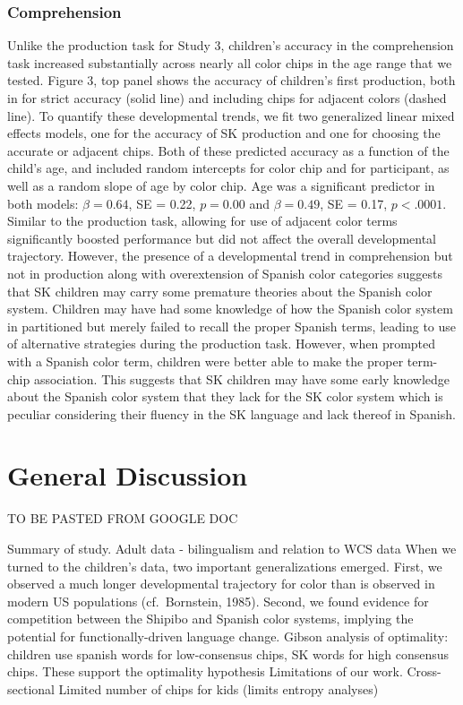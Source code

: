 \documentclass[
  english,
  ,man,floatsintext]{apa6}
\begin{document}
\hypertarget{comprehension}{%
\subsubsection{Comprehension}\label{comprehension}}

Unlike the production task for Study 3, children's accuracy in the comprehension task increased substantially across nearly all color chips in the age range that we tested. Figure 3, top panel shows the accuracy of children's first production, both in for strict accuracy (solid line) and including chips for adjacent colors (dashed line). To quantify these developmental trends, we fit two generalized linear mixed effects models, one for the accuracy of SK production and one for choosing the accurate or adjacent chips. Both of these predicted accuracy as a function of the child's age, and included random intercepts for color chip and for participant, as well as a random slope of age by color chip. Age was a significant predictor in both models: \(\beta = 0.64\), SE = 0.22, \(p = 0.00\) and \(\beta = 0.49\), SE = 0.17, \(p < .0001\).
Similar to the production task, allowing for use of adjacent color terms significantly boosted performance but did not affect the overall developmental trajectory. However, the presence of a developmental trend in comprehension but not in production along with overextension of Spanish color categories suggests that SK children may carry some premature theories about the Spanish color system. Children may have had some knowledge of how the Spanish color system in partitioned but merely failed to recall the proper Spanish terms, leading to use of alternative strategies during the production task. However, when prompted with a Spanish color term, children were better able to make the proper term-chip association. This suggests that SK children may have some early knowledge about the Spanish color system that they lack for the SK color system which is peculiar considering their fluency in the SK language and lack thereof in Spanish.

\hypertarget{general-discussion}{%
\section{General Discussion}\label{general-discussion}}

TO BE PASTED FROM GOOGLE DOC

Summary of study.
Adult data - bilingualism and relation to WCS data
When we turned to the children's data, two important generalizations emerged. First, we observed a much longer developmental trajectory for color than is observed in modern US populations (cf.~Bornstein, 1985).
Second, we found evidence for competition between the Shipibo and Spanish color systems, implying the potential for functionally-driven language change.
Gibson analysis of optimality: children use spanish words for low-consensus chips, SK words for high consensus chips. These support the optimality hypothesis
Limitations of our work.
Cross-sectional
Limited number of chips for kids (limits entropy analyses)
\end{document}
